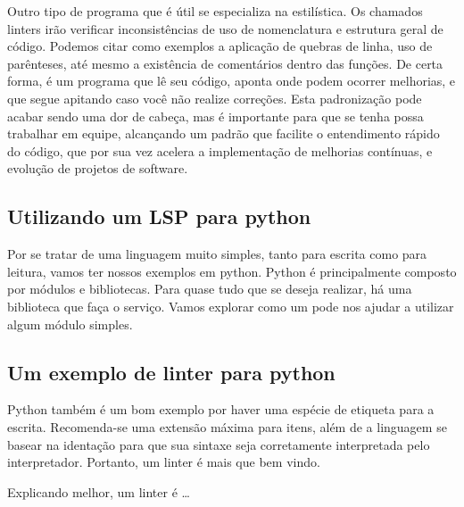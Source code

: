 Outro tipo de programa que é útil se especializa na estilística.
Os chamados linters irão verificar inconsistências de uso de nomenclatura e
estrutura geral de código. Podemos citar como exemplos a aplicação de quebras de linha, uso de parênteses,
até mesmo a existência de comentários dentro das funções.
De certa forma, é um programa que lê seu código, aponta onde podem ocorrer melhorias, e que segue apitando
caso você não realize correções.
Esta padronização pode acabar sendo uma dor de cabeça, mas é importante para que se tenha possa trabalhar em equipe,
alcançando um padrão que facilite o entendimento rápido do código, que por sua vez acelera a implementação de melhorias
contínuas, e evolução de projetos de software.

\subsection{Utilizando um LSP para python}
Por se tratar de uma linguagem muito simples, tanto para escrita como para leitura, vamos ter nossos exemplos em python.
Python é principalmente composto por módulos e bibliotecas.
Para quase tudo que se deseja realizar, há uma biblioteca que faça o serviço.
Vamos explorar como um  pode nos ajudar a utilizar algum módulo simples.

\subsection{Um exemplo de linter para python}
Python também é um bom exemplo por haver uma espécie de etiqueta para a escrita.
Recomenda-se uma extensão máxima para itens, além de a linguagem se basear na identação
para que sua sintaxe seja corretamente interpretada pelo interpretador.
Portanto, um linter é mais que bem vindo.

Explicando melhor, um linter é \ldots 

\newpage
